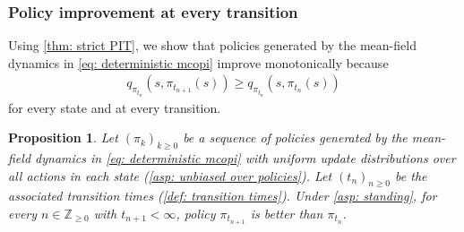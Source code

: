 \documentclass[twoside,11pt]{article}
\newtheorem{proposition}[proposition]{Proposition}
\begin{document}
 \subsubsection{Policy improvement at every transition}

Using \autoref{thm: strict PIT},
we show that
policies generated by the mean-field dynamics in \eqref{eq: deterministic mcopi} improve monotonically
because
\begin{align}
\label{eq: strict improvement theorem}
q_{\pi_{t_n}}(s,\pi_{t_{n+1}}(s)) \ge q_{\pi_{t_n}}(s,\pi_{t_n}(s))
\end{align}
for every state and at every transition.

\begin{proposition}
\label{thm: improving policies}
Let \((\pi_k)_{k\ge 0}\) be a sequence of policies generated by the mean-field dynamics in \eqref{eq: deterministic mcopi}
with uniform update distributions over all actions in each state (\autoref{asp: unbiased over policies}).
Let \((t_n)_{n\ge 0}\) be the associated transition times (\autoref{def: transition times}).
Under \autoref{asp: standing},
for every \(n \in \mathbb Z_{\ge 0}\) with \(t_{n+1}<\infty\), policy
\(\pi_{t_{n+1}}\) is better than \(\pi_{t_n}\).
\end{proposition}
\end{document}
